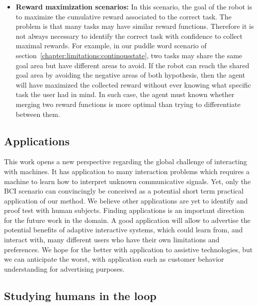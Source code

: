 \begin{itemize}
\item \textbf{Reward maximization scenarios:} In this scenario, the goal of the robot is to maximize the cumulative reward associated to the correct task. The problem is that many tasks may have similar reward functions. Therefore it is not always necessary to identify the correct task with confidence to collect maximal rewards. For example, in our puddle word scenario of section~\ref{chapter:limitations:continousstate}, two tasks may share the same goal area but have different areas to avoid. If the robot can reach the shared goal area by avoiding the negative areas of both hypothesis, then the agent will have maximized the collected reward without ever knowing what specific task the user had in mind. In such case, the agent must known whether merging two reward functions is more optimal than trying to differentiate between them.

\end{itemize}


\subsection{Applications}

This work opens a new perspective regarding the global challenge of interacting with machines. It has application to many interaction problems which requires a machine to learn how to interpret unknown communicative signals. Yet, only the BCI scenario can convincingly be conceived as a potential short term practical application of our method. We believe other applications are yet to identify and proof test with human subjects. Finding applications is an important direction for the future work in the domain. A good application will allow to advertise the potential benefits of adaptive interactive systems, which could learn from, and interact with, many different users who have their own limitations and preferences. We hope for the better with application to assistive technologies, but we can anticipate the worst, with application such as customer behavior understanding for advertising purposes.

\subsection{Studying humans in the loop}
\label{chapter:limitations:userstudies}


